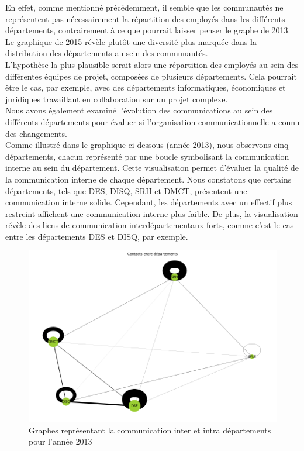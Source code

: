 \documentclass{article}
\begin{document}
En effet, comme mentionné précédemment, il semble que les communautés ne représentent pas nécessairement la répartition des employés dans les différents départements, contrairement à ce que pourrait laisser penser le graphe de 2013. Le graphique de 2015 révèle plutôt une diversité plus marquée dans la distribution des départements au sein des communautés. \\

L'hypothèse la plus plausible serait alors une répartition des employés au sein des différentes équipes de projet, composées de plusieurs départements. Cela pourrait être le cas, par exemple, avec des départements informatiques, économiques et juridiques travaillant en collaboration sur un projet complexe. \\

Nous avons également examiné l'évolution des communications au sein des différents départements pour évaluer si l'organisation communicationnelle a connu des changements. \\

Comme illustré dans le graphique ci-dessous (année 2013), nous observons cinq départements, chacun représenté par une boucle symbolisant la communication interne au sein du département. Cette visualisation permet d'évaluer la qualité de la communication interne de chaque département. Nous constatons que certains départements, tels que DES, DISQ, SRH et DMCT, présentent une communication interne solide. Cependant, les départements avec un effectif plus restreint affichent une communication interne plus faible. De plus, la visualisation révèle des liens de communication interdépartementaux forts, comme c'est le cas entre les départements DES et DISQ, par exemple.

\begin{figure}[!h]
    \centering
    \includegraphics[width=15cm]{assets/communaute/communaute_communication_2013.png}
    \caption{Graphes représentant la communication inter et intra départements pour l'année 2013}
    \label{fig:communaute_communication_2013}
\end{figure}
\end{document}
